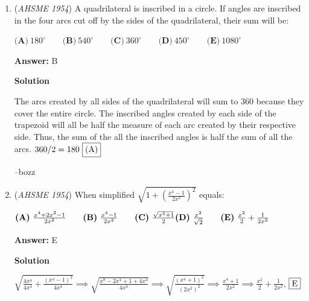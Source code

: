 \begin{enumerate}
 is: 


 $\textbf{(A)}\ x=18, y=12 \qquad  \textbf{(B)}\ x=0, y=0 \qquad  \textbf{(C)}\ \text{There is no solution} \\  \textbf{(D)}\ \text{There are an unlimited number of solutions}\qquad \textbf{(E)}\ x=8, y=5$

 \textbf{Answer: }C



\textbf{Solution}

$2x-3y=7\implies 4x-6y=14$Then $4x-6y=14=20$, which is false, so there are no solutions; $\fbox{C}$



	\item (\textit{AHSME 1954}) A quadrilateral is inscribed in a circle. If angles are inscribed in the four arcs cut off 
by the sides of the quadrilateral, their sum will be: 


 $\textbf{(A)}\ 180^\circ \qquad \textbf{(B)}\ 540^\circ \qquad \textbf{(C)}\ 360^\circ \qquad \textbf{(D)}\ 450^\circ\qquad\textbf{(E)}\ 1080^\circ$

 \textbf{Answer: }B



\textbf{Solution}

The arcs created by all sides of the quadrilateral will sum to 360 because they cover the entire circle. The inscribed angles created by each side of the trapezoid will all be half the measure of each arc created by their respective side. Thus, the sum of the all the inscribed angles is half the sum of all the arcs. $360/2 = 180\  \fbox{(A)}$

 --bozz

 


	\item (\textit{AHSME 1954}) When simplified $\sqrt{1+ \left (\frac{x^4-1}{2x^2} \right )^2}$ equals: 


 $\textbf{(A)}\ \frac{x^4+2x^2-1}{2x^2} \qquad \textbf{(B)}\ \frac{x^4-1}{2x^2} \qquad \textbf{(C)}\ \frac{\sqrt{x^2+1}}{2}\\ \textbf{(D)}\ \frac{x^2}{\sqrt{2}}\qquad\textbf{(E)}\ \frac{x^2}{2}+\frac{1}{2x^2}$

 \textbf{Answer: }E



\textbf{Solution}

$\sqrt{\frac{4x^4}{4x^4}+\frac{(x^4-1)^2}{4x^4}}\implies\sqrt{\frac{x^8-2x^4+1+4x^4}{4x^4}}\implies \sqrt{\frac{(x^4+1)^2}{(2x^2)^2}}\implies \frac{x^4+1}{2x^2}\implies\frac{x^2}{2}+\frac{1}{2x^2}$, $\fbox{E}$




\end{enumerate}
